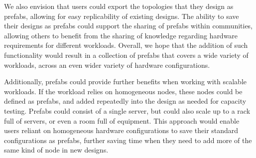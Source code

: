\documentclass[11pt]{article}
\begin{document}
		We also envision that users could export the topologies that they design as prefabs, allowing for easy replicability of existing designs.
		The ability to save their designs as prefabs could support the sharing of prefabs within communities, allowing others to benefit from the sharing of knowledge regarding hardware requirements for different workloads.
		Overall, we hope that the addition of such functionality would result in a collection of prefabs that covers a wide variety of workloads, across an even wider variety of hardware configurations.

		Additionally, prefabs could provide further benefits when working with scalable workloads.
		If the workload relies on homogeneous nodes, these nodes could be defined as prefabs, and added repeatedly into the design as needed for capacity testing.
		Prefabs could consist of a single server, but could also scale up to a rack full of servers, or even a room full of equipment.
		This approach would enable users reliant on homogeneous hardware configurations to save their standard configurations as prefabs, further saving time when they need to add more of the same kind of node in new designs.
	
\end{document}
